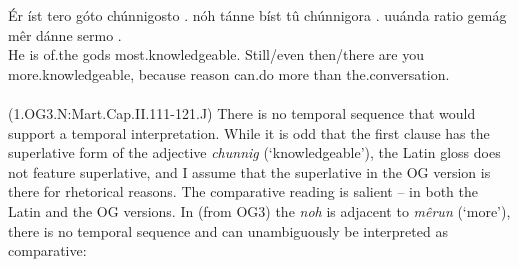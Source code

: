\documentclass[output=paper,
modfonts
]{langscibook}
\begin{document}
\ea\gll Ér íst tero góto {chúnnigosto .} nóh tánne bíst tû {chúnnigora .} uuánda ratio gemág mêr dánne {sermo .}\\
       He is of.the gods most.knowledgeable. Still/even then/there are you more.knowledgeable, because reason can.do more than the.conversation.\\
\label{OG3_noch_wissend} \\ (1.OG3.N:Mart.Cap.II.111-121.J)
\z
There is no temporal sequence that would support a temporal interpretation. While it is odd that the first clause has the superlative form of the adjective \textit{chunnig} (`knowledgeable'), the Latin gloss does not feature superlative, and I assume that the superlative in the OG version is there for rhetorical reasons. The comparative reading is salient -- in both the Latin and the OG versions. In  (from OG3) the \textit{noh} is adjacent to \textit{mêrun} (`more'), there is no temporal sequence and  can unambiguously be interpreted as comparative:
\end{document}
